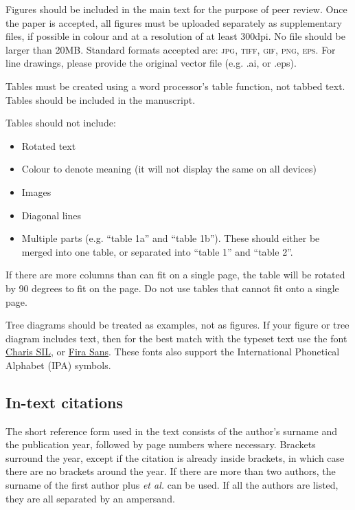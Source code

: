 \documentclass[charis,linguex]{glossa}
\begin{document}
Figures should be included in the main text for the purpose of peer review. Once the paper is accepted, all figures must be uploaded separately as supplementary files, if possible in colour and at a resolution of at least 300dpi. No file should be larger than 20MB. Standard formats accepted are: \textsc{jpg, tiff, gif, png, eps}. For line drawings, please provide the original vector file (e.g. .ai, or .eps).

Tables must be created using a word processor's table function, not tabbed text. Tables should be included in the manuscript.

Tables should not include:

\begin{itemize}
\item Rotated text
\item Colour to denote meaning (it will not display the same on all devices)
\item Images
\item Diagonal lines
\item Multiple parts (e.g. ``table 1a'' and ``table 1b''). These should either be merged into one table, or separated into ``table 1'' and ``table 2''.
\end{itemize}
If there are more columns than can fit on a single page, the table will be rotated by 90 degrees to fit on the page. Do not use tables that cannot fit onto a single page.

Tree diagrams should be treated as examples, not as figures. If your figure or tree diagram includes text, then for the best match with the typeset text use the font \href{https://software.sil.org/charis/download/}{Charis SIL}, or \href{https://www.fontsquirrel.com/fonts/fira-sans}{Fira Sans}. These fonts also support the International Phonetical Alphabet (IPA) symbols.


\subsection{In-text citations}

The short reference form used in the text consists of the author’s surname and the publication year, followed by page numbers where necessary. Brackets surround the year, except if the citation is already inside brackets, in which case there are no brackets around the year. If there are more than two authors, the surname of the first author plus \textit{et al.} can be used. If all the authors are listed, they are all separated by an ampersand.
\end{document}
